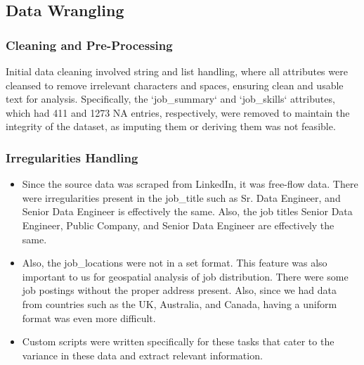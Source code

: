 \documentclass[a4paper,10pt]{article}
\begin{document}
\subsection{Data Wrangling}
    \subsubsection{Cleaning and Pre-Processing}
    Initial data cleaning involved string and list handling, where all attributes were cleansed to remove irrelevant characters and spaces, ensuring clean and usable text for analysis. Specifically, the `job\_summary` and `job\_skills` attributes, which had 411 and 1273 NA entries, respectively, were removed to maintain the integrity of the dataset, as imputing them or deriving them was not feasible.

    \subsubsection{Irregularities Handling}
        \begin{itemize}
        \item  Since the source data was scraped from LinkedIn, it was free-flow data. There were irregularities present in the job\_title such as Sr. Data Engineer, and Senior Data Engineer is effectively the same. Also, the job titles Senior Data Engineer, Public Company, and Senior Data Engineer are effectively the same. 
        \item Also, the job\_locations were not in a set format. This feature was also important to us for geospatial analysis of job distribution. There were some job postings without the proper address present. Also, since we had data from countries such as the UK, Australia, and Canada, having a uniform format was even more difficult.
        \item  Custom scripts were written specifically for these tasks that cater to the variance in these data and extract relevant information.
    \end{itemize}
    
\end{document}

